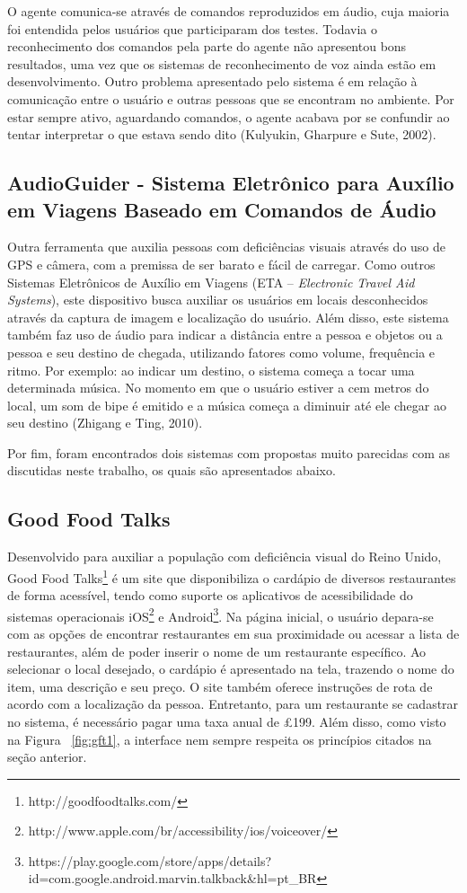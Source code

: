 O agente comunica-se através de comandos reproduzidos em áudio, cuja maioria foi entendida pelos usuários que participaram dos testes. Todavia o reconhecimento dos comandos pela parte do agente não apresentou bons resultados, uma vez que os sistemas de reconhecimento de voz ainda estão em desenvolvimento. Outro problema apresentado pelo sistema é em relação à comunicação entre o usuário e outras pessoas que se encontram no ambiente. Por estar sempre ativo, aguardando comandos, o agente acabava por se confundir ao tentar interpretar o que estava sendo dito (Kulyukin, Gharpure e Sute, 2002)\nocite{KULYUKIN2002}. 

\subsection{AudioGuider - Sistema Eletrônico para Auxílio em Viagens Baseado em Comandos de Áudio}
Outra ferramenta que auxilia pessoas com deficiências visuais através do uso de GPS e câmera, com a premissa de ser barato e fácil de carregar. Como outros Sistemas Eletrônicos de Auxílio em Viagens (ETA -- \emph{Electronic Travel Aid Systems}), este dispositivo busca auxiliar os usuários em locais desconhecidos através da captura de imagem e localização do usuário. Além disso, este sistema também faz uso de áudio para indicar a distância entre a pessoa e objetos ou a pessoa e seu destino de chegada, utilizando fatores como volume, frequência e ritmo. Por exemplo: ao indicar um destino, o sistema começa a tocar uma determinada música. No momento em que o usuário estiver a cem metros do local, um som de bipe é emitido e a música começa a diminuir até ele chegar ao seu destino (Zhigang e Ting, 2010)\nocite{ZHIGANG2010}.

\vspace{0.5cm}
Por fim, foram encontrados dois sistemas com propostas muito parecidas com as discutidas neste trabalho, os quais são apresentados abaixo.

\subsection{Good Food Talks}
Desenvolvido para auxiliar a população com deficiência visual do Reino Unido, Good Food Talks\footnote{http://goodfoodtalks.com/} é um site que disponibiliza o cardápio de diversos restaurantes de forma acessível, tendo como suporte os aplicativos de acessibilidade do sistemas operacionais iOS\footnote{http://www.apple.com/br/accessibility/ios/voiceover/} e Android\footnote{https://play.google.com/store/apps/details?id=com.google.android.marvin.talkback\&hl=pt\_BR}. Na página inicial, o usuário depara-se com as opções de encontrar restaurantes em sua proximidade ou acessar a lista de restaurantes, além de poder inserir o nome de um restaurante específico. Ao selecionar o local desejado, o cardápio é apresentado na tela, trazendo o nome do item, uma descrição e seu preço. O site também oferece instruções de rota de acordo com a localização da pessoa. Entretanto, para um restaurante se cadastrar no sistema, é necessário pagar uma taxa anual de £199. Além disso, como visto na Figura ~\ref{fig:gft1}, a interface nem sempre respeita os princípios citados na seção anterior.

